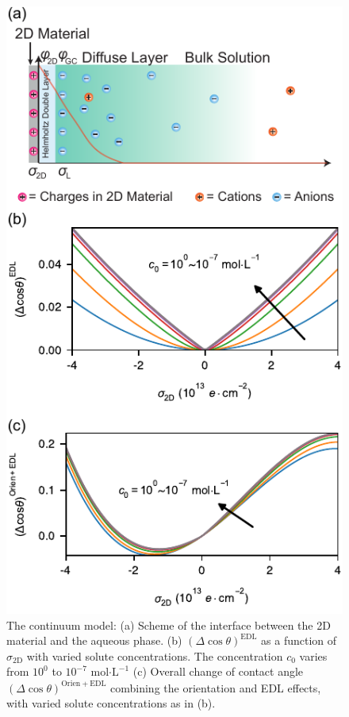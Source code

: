 \documentclass[journal=ancac3,manuscript=article,email=true,hyperref=true,keywords=true]{achemso}
\begin{document}
\begin{figure}[htbp]
\centering
\includegraphics[width=0.5\linewidth]{../img/2d-ph-dependency+MD.pdf}
\caption{\label{fig:res-EDL}
The continuum model: (a) Scheme of the interface between the 2D material and the aqueous phase. (b) \((\Delta\cos\theta)^{\mathrm{EDL}}\) as a function of \(\sigma_{\mathrm{2D}}\) with varied solute concentrations. The concentration \(c_{0}\) varies from \(10^{0}\) to \(10^{-7}\) mol\(\cdot\mathrm{L}^{-1}\) (c) Overall change of contact angle \((\Delta \cos \theta)^{\mathrm{Orien+EDL}}\) combining the orientation and EDL effects, with varied solute concentrations as in (b).}
\end{figure}
\end{document}
